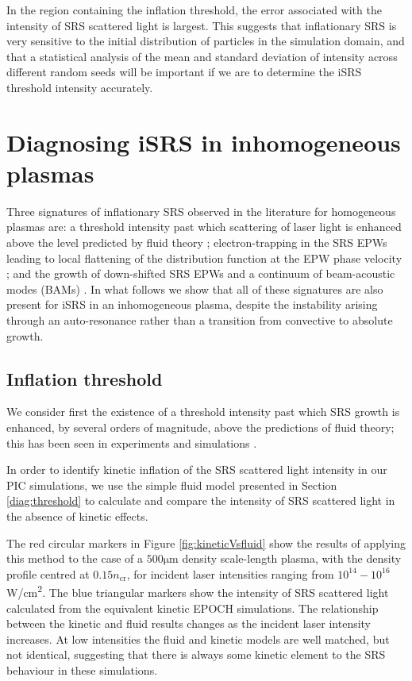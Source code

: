 In the region containing the inflation threshold, the error associated with the intensity of SRS scattered light is largest. This suggests that inflationary SRS is very sensitive to the initial distribution of particles in the simulation domain, and that a statistical analysis of the mean and standard deviation of intensity across different random seeds will be important if we are to determine the iSRS threshold intensity accurately.


\section{Diagnosing iSRS in inhomogeneous plasmas}\label{sec:signatures}
Three signatures of inflationary SRS observed in the literature for homogeneous plasmas are: a threshold intensity past which scattering of laser light is enhanced above the level predicted by fluid theory \citep{Vu2007}; electron-trapping in the SRS EPWs leading to local flattening of the distribution function at the EPW phase velocity \citep{Vu2002}; and the growth of down-shifted SRS EPWs and a continuum of beam-acoustic modes (BAMs) \citep{Yin2006}.
In what follows we show that all of these signatures are also present for iSRS in an inhomogeneous plasma, despite the instability arising through an auto-resonance rather than a transition from convective to absolute growth.

\subsection{Inflation threshold}
We consider first the existence of  a threshold intensity past which SRS growth is enhanced, by several
orders of magnitude, above the predictions of fluid theory; this has been seen in experiments \citep{Kline2006} and simulations \citep{Vu2002,Yin2006,Vu2007,Riconda2011}.

In order to identify kinetic inflation of the SRS scattered light intensity in our PIC simulations,
we use the simple fluid model presented in Section \ref{diag:threshold} to calculate and compare the intensity of SRS scattered light in the absence of kinetic effects.

The red circular markers in Figure \ref{fig:kineticVsfluid} show the results of applying this method to the case of a $500\si{\micro\metre} $ density scale-length plasma, with the density profile centred at $0.15n_\mathrm{cr}$, for incident laser intensities ranging from $10^{14} - 10^{16}$\si{W/\centi\metre^2}. The blue triangular markers show the intensity of SRS scattered light calculated from the equivalent kinetic EPOCH simulations. The relationship between the kinetic and fluid results changes as the incident laser intensity increases. At low intensities the fluid and kinetic models are well matched, but not identical, suggesting that there is always some kinetic element to the SRS behaviour in these simulations.

